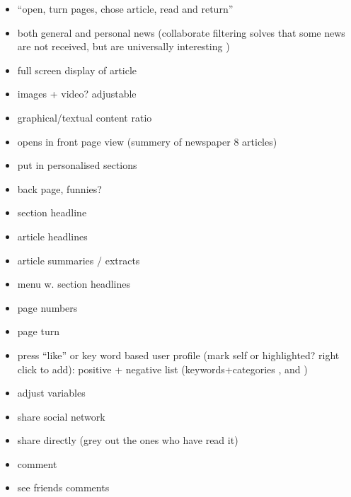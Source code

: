 \begin{itemize}
	\item ``open, turn pages, chose article, read and return'' \cite[p. 6]{FULLTEXT01.pdf}
	\item both general and personal news (collaborate filtering solves that some news are not received, but are universally interesting \cite{fulltext.pdf})
	\item full screen display of article
	\item images + video? adjustable
	\item graphical/textual content ratio
	\item opens in front page view (summery of newspaper 8 articles) \cite[p. 8]{kristin_fredrik.pdf}
	\item put in personalised sections
	\item back page, funnies?
	\item section headline \cite[p. 6-7]{kristin_fredrik.pdf}
	\item article headlines
	\item article summaries / extracts \cite{fulltext.pdf}
	\item menu w. section headlines \cite[p. 8]{kristin_fredrik.pdf}
	\item page numbers \cite[p. 6-7]{kristin_fredrik.pdf}
	\item page turn
	\item press ``like'' or key word based user profile (mark self or highlighted? right click to add): positive + negative list (keywords+categories \cite{10-1-1-19-5583}, \cite{fulltext.pdf} and \cite{gervasum2001ws.pdf})
	\item adjust variables
	\item share social network
	\item share directly (grey out the ones who have read it)
	\item comment
	\item see friends comments
\end{itemize}

